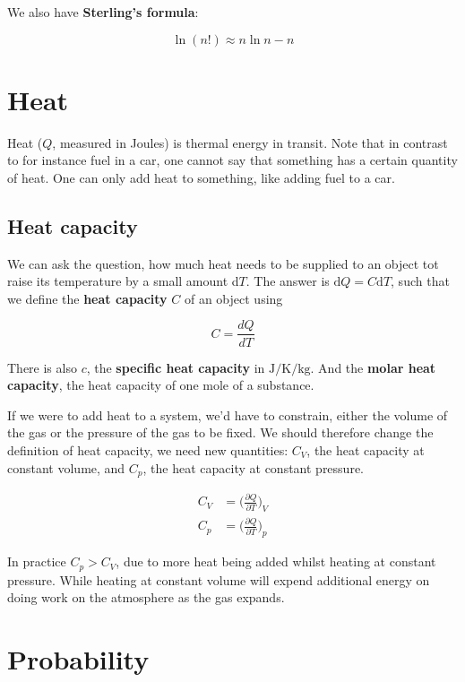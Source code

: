 \documentclass[a4paper]{article}
\begin{document}
We also have \textbf{Sterling's formula}:

\begin{equation}
	\ln(n!)\approx n\ln n-n
\end{equation}

\section{Heat}

Heat ($Q$, measured in Joules) is thermal energy in transit. Note that in contrast to for instance fuel in a car, one cannot say that something has a certain quantity of heat. One can only add heat to something, like adding fuel to a car.

\subsection{Heat capacity}

We can ask the question, how much heat needs to be supplied to an object tot raise its temperature by a small amount d$T$. The answer is $\text{d}Q=C\text{d}T$, such that we define the \textbf{heat capacity} $C$ of an object using

\begin{equation}
	C=\frac{dQ}{dT}
\end{equation}

There is also $c$, the \textbf{specific heat capacity} in $\si{\joule\per\kelvin\per\kilo\gram}$. And the \textbf{molar heat capacity}, the heat capacity of one mole of a substance. 

\bigskip

If we were to add heat to a system, we'd have to constrain, either the volume of the gas or the pressure of the gas to be fixed. We should therefore change the definition of heat capacity, we need new quantities: $C_V$, the heat capacity at constant volume, and $C_p$, the heat capacity at constant pressure.

\begin{align}
	C_V&=\bigg(\frac{\partial Q}{\partial T}\bigg)_V\\[1em]
	C_p&=\bigg(\frac{\partial Q}{\partial T}\bigg)_p
\end{align}

In practice $C_p>C_V$, due to more heat being added whilst heating at constant pressure. While heating at constant volume will expend additional energy on doing work on the atmosphere as the gas expands. 

\section{Probability}
\end{document}
